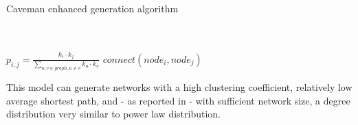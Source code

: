 \begin{algorithm}
\caption{Caveman enhanced generation algorithm}
\label{sn_ca_alg}
\begin{algorithmic}
\STATE
{}\\
\\
		\STATE $p_{i,j}=\frac{k_{i} \cdot k_{j}}{\sum_{u,v \in graph, u \neq v}{k_{u} \cdot k_{v}}}$
	 		\STATE $connect(node_{i},node_{j})$
 		\ENDIF
 	\ENDFOR
\ENDFOR
\end{algorithmic}
\end{algorithm}

This model can generate networks with a high clustering coefficient, relatively low average shortest path, and - as reported in\cite{4149781} - with sufficient network size, a degree distribution very similar to power law distribution.
